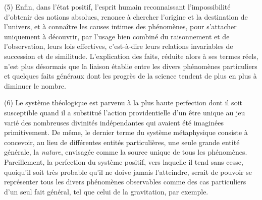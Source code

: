 \documentclass[french,twoside]{book} %
\begin{document}
(5) Enfin, dans l’état positif, l’esprit humain reconnaissant l’impossibilité d’obtenir des notions absolues, renonce à chercher l’origine et la destination de l’univers, et à connaître les causes intimes des phénomènes, pour s’attacher uniquement à découvrir, par l’usage bien combiné du raisonnement et de l’observation, leurs lois effectives, c’est-à-dire leurs relations invariables de succession et de similitude. L’explication des faits, réduite alors à ses termes réels, n’est plus désormais que la liaison établie entre les divers phénomènes particuliers et quelques faits généraux dont les progrès de la science tendent de plus en plus à diminuer le nombre.\par
(6) Le système théologique est parvenu à la plus haute perfection dont il soit susceptible quand il a substitué l’action providentielle d’un être unique au jeu varié des nombreuses divinités indépendantes qui avaient été imaginées primitivement. De même, le dernier terme du système métaphysique consiste à concevoir, au lieu de différentes entités particulières, une seule grande entité générale, la {\itshape nature}, envisagée comme la source unique de tous les phénomènes. Pareillement, la perfection du système positif, vers laquelle il tend sans cesse, quoiqu’il soit très probable qu’il ne doive jamais l’atteindre, serait de pouvoir se représenter tous les divers phénomènes observables comme des cas particuliers d’un seul fait général, tel que celui de la gravitation, par exemple.
\end{document}
